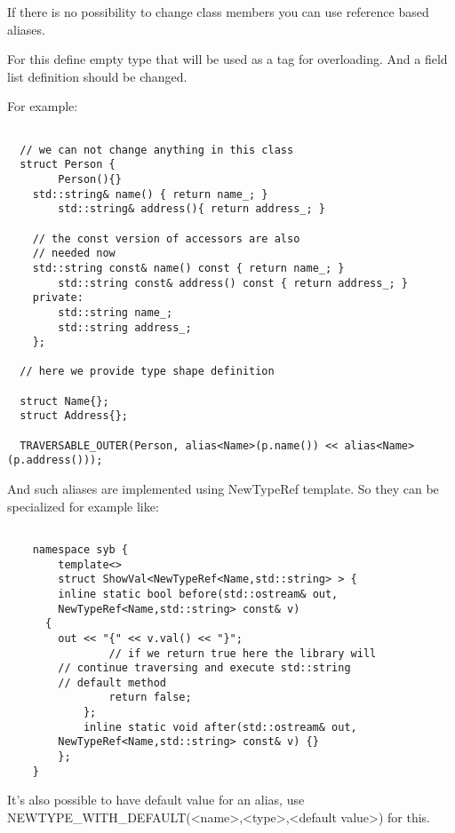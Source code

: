 \documentclass[a4paper]{article}
\begin{document}
If there is no possibility to change class members you can use reference based aliases.

For this define empty type that will be used as a tag for overloading. And a field list
definition should be changed.

For example:

\begin{lstlisting}

  // we can not change anything in this class
  struct Person {
		Person(){}
    std::string& name() { return name_; }
		std::string& address(){ return address_; }

    // the const version of accessors are also 
    // needed now
    std::string const& name() const { return name_; }
		std::string const& address() const { return address_; }
	private:
		std::string name_;
		std::string address_;
	};

  // here we provide type shape definition

  struct Name{};
  struct Address{};

  TRAVERSABLE_OUTER(Person, alias<Name>(p.name()) << alias<Name>(p.address()));

\end{lstlisting}

And such aliases are implemented using NewTypeRef template. So they can be specialized 
for example like:

\begin{lstlisting}

	namespace syb {
		template<>
		struct ShowVal<NewTypeRef<Name,std::string> > {
  		inline static bool before(std::ostream& out, 
        NewTypeRef<Name,std::string> const& v) 
      {
        out << "{" << v.val() << "}";
				// if we return true here the library will 
        // continue traversing and execute std::string 
        // default method 
				return false;
			};
			inline static void after(std::ostream& out, 
        NewTypeRef<Name,std::string> const& v) {}
		};
	}

\end{lstlisting}

It's also possible to have default value for an alias, 
use NEWTYPE\_WITH\_DEFAULT(<name>,<type>,<default value>) for this.
\end{document}
